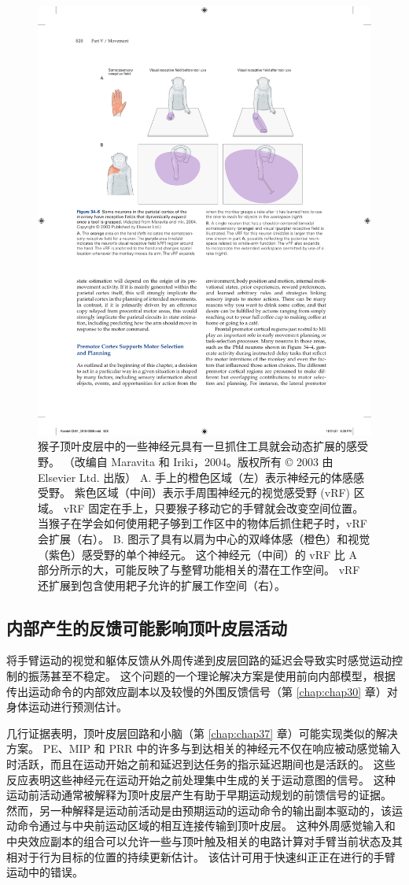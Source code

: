 \begin{figure}[htbp]
	\centering
	\includegraphics[width=0.8\linewidth]{chap34/fig_34_6}
	\caption{猴子顶叶皮层中的一些神经元具有一旦抓住工具就会动态扩展的感受野。 （改编自 Maravita 和 Iriki，2004。版权所有 © 2003 由 Elsevier Ltd. 出版） A. 手上的橙色区域（左）表示神经元的体感感受野。 紫色区域（中间）表示手周围神经元的视觉感受野 (vRF) 区域。 vRF 固定在手上，只要猴子移动它的手臂就会改变空间位置。 当猴子在学会如何使用耙子够到工作区中的物体后抓住耙子时，vRF 会扩展（右）。 B. 图示了具有以肩为中心的双峰体感（橙色）和视觉（紫色）感受野的单个神经元。 这个神经元（中间）的 vRF 比 A 部分所示的大，可能反映了与整臂功能相关的潜在工作空间。 vRF 还扩展到包含使用耙子允许的扩展工作空间（右）。}
	\label{fig:34_6}
\end{figure}


\subsection{内部产生的反馈可能影响顶叶皮层活动}
将手臂运动的视觉和躯体反馈从外周传递到皮层回路的延迟会导致实时感觉运动控制的振荡甚至不稳定。 这个问题的一个理论解决方案是使用前向内部模型，根据传出运动命令的内部效应副本以及较慢的外围反馈信号（第 \ref{chap:chap30} 章）对身体运动进行预测估计。

几行证据表明，顶叶皮层回路和小脑（第 \ref{chap:chap37} 章）可能实现类似的解决方案。 PE、MIP 和 PRR 中的许多与到达相关的神经元不仅在响应被动感觉输入时活跃，而且在运动开始之前和延迟到达任务的指示延迟期间也是活跃的。 这些反应表明这些神经元在运动开始之前处理集中生成的关于运动意图的信号。 这种运动前活动通常被解释为顶叶皮层产生有助于早期运动规划的前馈信号的证据。 然而，另一种解释是运动前活动是由预期运动的运动命令的输出副本驱动的，该运动命令通过与中央前运动区域的相互连接传输到顶叶皮层。 这种外周感觉输入和中央效应副本的组合可以允许一些与顶叶触及相关的电路计算对手臂当前状态及其相对于行为目标的位置的持续更新估计。 该估计可用于快速纠正正在进行的手臂运动中的错误。

